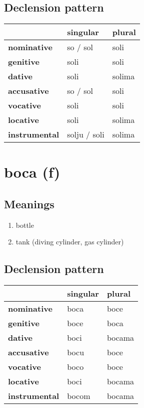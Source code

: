 \subsection*{Declension pattern}
\begin{tabularx}{\linewidth}{Xll}
\toprule
{} &      singular &  plural \\
\midrule
\textbf{nominative  } &      so / sol &    soli \\
\textbf{genitive    } &          soli &    soli \\
\textbf{dative      } &          soli &  solima \\
\textbf{accusative  } &      so / sol &    soli \\
\textbf{vocative    } &          soli &    soli \\
\textbf{locative    } &          soli &  solima \\
\textbf{instrumental} &  solju / soli &  solima \\
\bottomrule
\end{tabularx}

\filbreak
\section{boca (f)}
\subsection*{Meanings}
\begin{enumerate}
\item bottle
\item tank (diving cylinder, gas cylinder)
\end{enumerate}
\subsection*{Declension pattern}
\begin{tabularx}{\linewidth}{Xll}
\toprule
{} & singular &  plural \\
\midrule
\textbf{nominative  } &     boca &    boce \\
\textbf{genitive    } &     boce &    boca \\
\textbf{dative      } &     boci &  bocama \\
\textbf{accusative  } &     bocu &    boce \\
\textbf{vocative    } &     boco &    boce \\
\textbf{locative    } &     boci &  bocama \\
\textbf{instrumental} &    bocom &  bocama \\
\bottomrule
\end{tabularx}

